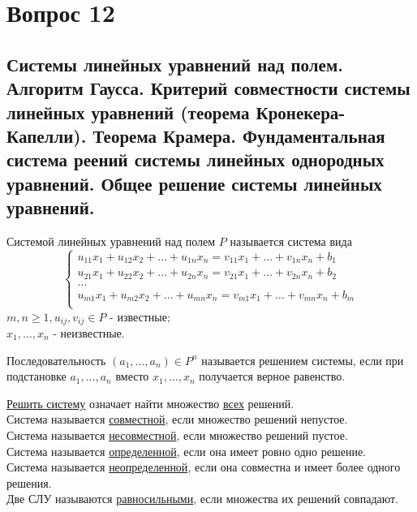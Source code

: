 \section{Вопрос 12}

\subsection{Системы линейных уравнений над полем.
Алгоритм Гаусса.
Критерий совместности системы линейных уравнений (теорема Кронекера-Капелли).
Теорема Крамера.
Фундаментальная система реений системы линейных однородных уравнений.
Общее решение системы линейных уравнений.
}

\begin{defs}
  Системой линейных уравнений над полем $P$ называется система вида
  \begin{equation*}
    \begin{cases}
      u_{11}x_1 + u_{12}x_2 + \ldots + u_{1n}x_n = v_{11}x_1 + \ldots + v_{1n}x_n + b_1 \\
      u_{21}x_1 + u_{22}x_2 + \ldots + u_{2n}x_n = v_{21}x_1 + \ldots + v_{2n}x_n + b_2 \\
      \ldots \\
      u_{m1}x_1 + u_{m2}x_2 + \ldots + u_{mn}x_n = v_{m1}x_1 + \ldots + v_{mn}x_n + b_m \\
    \end{cases}
  \end{equation*}
  $m,n \geqslant 1, u_{ij}, v_{ij} \in P$ - известные; \\
  $x_1, \ldots, x_n$ - неизвестные.
\end{defs}

\begin{defs}
  Последовательность $(a_1, \ldots, a_n) \in P^n$ называется решением системы, если
  при подстановке $a_1, \ldots, a_n$ вместо $x_1, \ldots, x_n$ получается верное равенство.
\end{defs}

\begin{defs}
\underline{Решить систему} означает найти множество \underline{всех} решений. \\
Система называется \underline{совместной}, если множество решений непустое. \\
Система называется \underline{несовместной}, если множество решений пустое. \\
Система называется \underline{определенной}, если она имеет ровно одно решение. \\
Система называется \underline{неопределенной}, если она совместна и имеет более одного решения. \\
Две СЛУ называются \underline{равносильными}, если множества их решений совпадают. \\
\end{defs}

